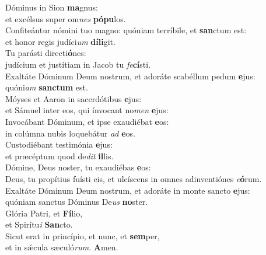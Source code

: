 \evenverse Dóminus in Sion \textbf{ma}gnus:~\*\\
\evenverse et excélsus super om\textit{nes} \textbf{pó}\textbf{pu}los.\\
\oddverse Confiteántur nómini tuo magno: quóniam terríbile, et \textbf{san}ctum est:~\*\\
\oddverse et honor regis judíci\textit{um} \textbf{dí}\textbf{li}git.\\
\evenverse Tu parásti directi\textbf{ó}nes:~\*\\
\evenverse judícium et justítiam in Jacob tu \textit{fe}\textbf{cí}sti.\\
\oddverse Exaltáte Dóminum Deum nostrum, et adoráte scabéllum pedum \textbf{e}jus:~\*\\
\oddverse quóni\textit{am} \textbf{san}\textbf{ctum} est.\\
\evenverse Móyses et Aaron in sacerdótibus \textbf{e}jus:~\*\\
\evenverse et Sámuel inter eos, qui ínvocant no\textit{men} \textbf{e}jus:\\
\oddverse Invocábant Dóminum, et ipse exaudiébat \textbf{e}os:~\*\\
\oddverse in colúmna nubis loquebátur \textit{ad} \textbf{e}os.\\
\evenverse Custodiébant testimónia \textbf{e}jus:~\*\\
\evenverse et præcéptum quod de\textit{dit} \textbf{il}lis.\\
\oddverse Dómine, Deus noster, tu exaudiébas \textbf{e}os:~\*\\
\oddverse Deus, tu propítius fuísti eis, et ulcíscens in omnes adinventiónes \textit{e}\textbf{ó}rum.\\
\evenverse Exaltáte Dóminum Deum nostrum, et adoráte in monte sancto \textbf{e}jus:~\*\\
\evenverse quóniam sanctus Dóminus De\textit{us} \textbf{no}ster.\\
\oddverse Glória Patri, et \textbf{Fí}lio,~\*\\
\oddverse et Spirítu\textit{i} \textbf{San}cto.\\
\evenverse Sicut erat in princípio, et nunc, et \textbf{sem}per,~\*\\
\evenverse et in sǽcula sæculó\textit{rum}. \textbf{A}men.\\

